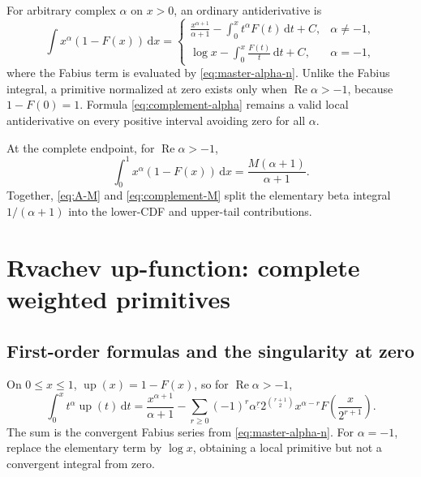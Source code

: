 \documentclass[11pt,oneside]{article}
\theoremstyle{definition}
\theoremstyle{remark}
\newcommand{\Up}{\operatorname{up}}
\newcommand{\dd}{\,\mathrm d}
\newcommand{\fall}[2]{#1^{\underline{#2}}}
\newcommand{\1}{\mathbf 1}
\DeclareMathOperator{\Rea}{Re}
\begin{document}
For arbitrary complex \(\alpha\) on \(x>0\), an ordinary antiderivative is
\begin{equation}
 \int x^\alpha(1-F(x))\dd x=
 \begin{cases}
 \displaystyle \frac{x^{\alpha+1}}{\alpha+1}
 -\int_0^x t^\alpha F(t)\dd t+C,&\alpha\neq-1,\\[3mm]
 \displaystyle \log x-\int_0^x\frac{F(t)}t\dd t+C,&\alpha=-1,
 \end{cases}                                                    \label{eq:complement-alpha}
\end{equation}
where the Fabius term is evaluated by \eqref{eq:master-alpha-n}.  Unlike the
Fabius integral, a primitive normalized at zero exists only when
\(\Rea\alpha>-1\), because \(1-F(0)=1\).  Formula
\eqref{eq:complement-alpha} remains a valid local antiderivative on every
positive interval avoiding zero for all \(\alpha\).

At the complete endpoint, for \(\Rea\alpha>-1\),
\begin{equation}
 \int_0^1x^\alpha(1-F(x))\dd x
 =\frac{M(\alpha+1)}{\alpha+1}.                                \label{eq:complement-M}
\end{equation}
Together, \eqref{eq:A-M} and \eqref{eq:complement-M} split the elementary
beta integral \(1/(\alpha+1)\) into the lower-CDF and upper-tail contributions.

\section{Rvachev up-function: complete weighted primitives}

\subsection{First-order formulas and the singularity at zero}
On \(0\leq x\leq1\), \(\Up(x)=1-F(x)\), so for
\(\Rea\alpha>-1\),
\begin{equation}
 \int_0^xt^\alpha\Up(t)\dd t
 =\frac{x^{\alpha+1}}{\alpha+1}
 -\sum_{r\geq0}(-1)^r\fall\alpha r
 2^{\binom{r+1}{2}}x^{\alpha-r}
 F\!\left(\frac{x}{2^{r+1}}\right).                            \label{eq:up-positive-alpha}
\end{equation}
The sum is the convergent Fabius series from \eqref{eq:master-alpha-n}.
For \(\alpha=-1\), replace the elementary term by \(\log x\), obtaining a
local primitive but not a convergent integral from zero.
\end{document}

